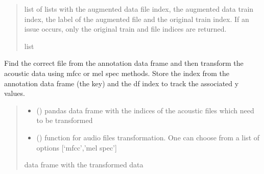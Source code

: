 \documentclass[letterpaper,10pt,english]{sphinxmanual}
\begin{document}
\begin{fulllineitems}
\begin{fulllineitems}
\begin{quote}
\begin{description}
\sphinxAtStartPar
list of lists with the augmented data file index, the augmented data train index, the label of the augmented file and the original train index. If an issue occurs, only the original train and file indices are returned.

\sphinxAtStartPar
list

\end{description}\end{quote}

\end{fulllineitems}


\begin{fulllineitems}
\label{\detokenize{BeeClassification:BeeClassification.BeeClassification.data_transformation_df}}
\pysigstartsignatures
{}
\pysigstopsignatures
\sphinxAtStartPar
Find the correct file from the annotation data frame and then transform the acoustic data using mfcc or mel spec methods. Store the index from the annotation data frame (the key) and the df index to track the associated y values.
\begin{quote}\begin{description}
\begin{itemize}
\item {} 
\sphinxAtStartPar
{} () \textendash{} pandas data frame with the indices of the acoustic files which need to be transformed

\item {} 
\sphinxAtStartPar
{} () \textendash{} function for audio files transformation. One can choose from a list of options {[}‘mfcc’,’mel spec’{]}

\end{itemize}

\sphinxAtStartPar
data frame with the transformed data


\end{description}
\end{quote}
\end{fulllineitems}
\end{fulllineitems}
\end{document}
